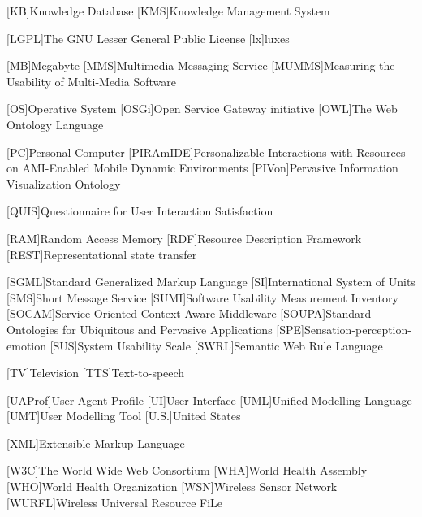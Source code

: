 \begin{acronym}[dynui]
  [KB]{Knowledge Database}
  [KMS]{Knowledge Management System}
  
  [LGPL]{The GNU Lesser General Public License}
  [lx]{luxes}
  
  [MB]{Megabyte}
  [MMS]{Multimedia Messaging Service}
  [MUMMS]{Measuring the Usability of Multi-Media Software}
  
  [OS]{Operative System}
  [OSGi]{Open Service Gateway initiative}
  [OWL]{The Web Ontology Language}
  
  [PC]{Personal Computer}
  [PIRAmIDE]{Personalizable Interactions with Resources on AMI-Enabled Mobile Dynamic Environments}
  [PIVon]{Pervasive Information Visualization Ontology}
  
  [QUIS]{Questionnaire for User Interaction Satisfaction}
  
  [RAM]{Random Access Memory}
  [RDF]{Resource Description Framework}
  [REST]{Representational state transfer}
  
  [SGML]{Standard Generalized Markup Language}
  [SI]{International System of Units}
  [SMS]{Short Message Service}
  [SUMI]{Software Usability Measurement Inventory}
  [SOCAM]{Service-Oriented Context-Aware Middleware}
  [SOUPA]{Standard Ontologies for Ubiquitous and Pervasive Applications}
  [SPE]{Sensation-perception-emotion}
  [SUS]{System Usability Scale}
  [SWRL]{Semantic Web Rule Language}
  
  [TV]{Television}
  [TTS]{Text-to-speech}
  
  [UAProf]{User Agent Profile}
  [UI]{User Interface} %
  [UML]{Unified Modelling Language}
  [UMT]{User Modelling Tool}
  [U.S.]{United States}
  
  [XML]{Extensible Markup Language}
  
  [W3C]{The World Wide Web Consortium}
  [WHA]{World Health Assembly}
  [WHO]{World Health Organization}
  [WSN]{Wireless Sensor Network}
  [WURFL]{Wireless Universal Resource FiLe}

\end{acronym}
